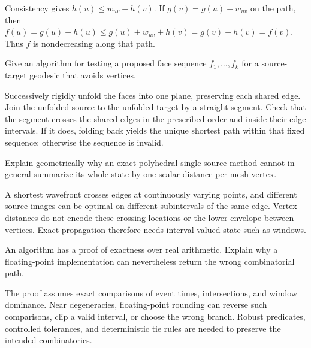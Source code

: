 \begin{solution}
Consistency gives \(h(u)\le w_{uv}+h(v)\).  If \(g(v)=g(u)+w_{uv}\) on the path, then \(f(u)=g(u)+h(u)\le g(u)+w_{uv}+h(v)=g(v)+h(v)=f(v)\).  Thus \(f\) is nondecreasing along that path.
\end{solution}

\begin{problem}\label{prob:vii39-ch02}
Give an algorithm for testing a proposed face sequence \(f_1,\ldots,f_k\) for a source-target geodesic that avoids vertices.
\end{problem}

\begin{solution}
Successively rigidly unfold the faces into one plane, preserving each shared edge.  Join the unfolded source to the unfolded target by a straight segment.  Check that the segment crosses the shared edges in the prescribed order and inside their edge intervals.  If it does, folding back yields the unique shortest path within that fixed sequence; otherwise the sequence is invalid.
\end{solution}

\begin{problem}\label{prob:vii39-ch03}
Explain geometrically why an exact polyhedral single-source method cannot in general summarize its whole state by one scalar distance per mesh vertex.
\end{problem}

\begin{solution}
A shortest wavefront crosses edges at continuously varying points, and different source images can be optimal on different subintervals of the same edge.  Vertex distances do not encode these crossing locations or the lower envelope between vertices.  Exact propagation therefore needs interval-valued state such as windows.
\end{solution}

\begin{problem}\label{prob:vii39-ch04}
An algorithm has a proof of exactness over real arithmetic.  Explain why a floating-point implementation can nevertheless return the wrong combinatorial path.
\end{problem}

\begin{solution}
The proof assumes exact comparisons of event times, intersections, and window dominance.  Near degeneracies, floating-point rounding can reverse such comparisons, clip a valid interval, or choose the wrong branch.  Robust predicates, controlled tolerances, and deterministic tie rules are needed to preserve the intended combinatorics.
\end{solution}

